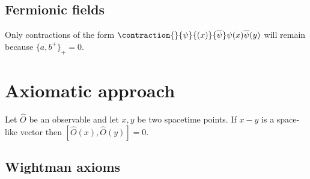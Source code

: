 \subsection{Fermionic fields}
	\begin{remark}
		Only contractions of the form $\contraction{}{\psi}{(x)}{\overline\psi}\psi(x)\overline\psi(y)$ will remain because $\{a, b^+\}_+ = 0$.
	\end{remark}
	
	
\section{Axiomatic approach}

	 \begin{theorem}\label{qft:microcausality}
	 	Let $\hat{O}$ be an observable and let $x, y$ be two spacetime points. If $x-y$ is a space-like vector then $[\hat{O}(x), \hat{O}(y)] = 0$.
	 \end{theorem}
	 
\subsection{Wightman axioms}
